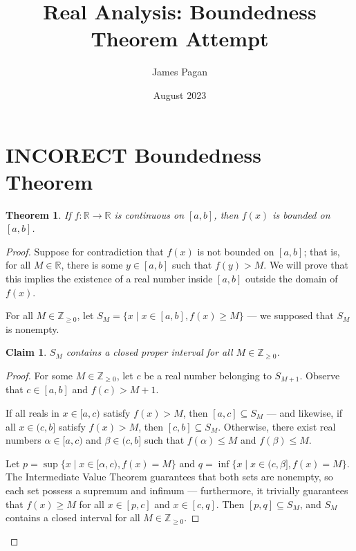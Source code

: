 \documentclass[11pt]{article}
\title{Real Analysis: Boundedness Theorem Attempt}
\author{James Pagan}
\date{August 2023}
\newtheorem*{theorem*}{Theorem}
\newtheorem*{claim*}{Claim}
\begin{document}
\maketitle
\tableofcontents


\section{INCORECT Boundedness Theorem}

\begin{theorem*}
	If $f \colon \mathbb{R} \to \mathbb{R}$ is continuous on $[a, b]$, then $f(x)$ is bounded on $[a, b]$.
\end{theorem*}

\begin{proof}

Suppose for contradiction that $f(x)$ is not bounded on $[a, b]$; that is, for all $M \in \mathbb{R}$, there is some $y \in [a, b]$ such that $f(y) > M$. We will prove that this implies the existence of a real number inside $[a, b]$ outside the domain of $f(x)$.

For all $M \in \mathbb{Z}_{\ge 0}$, let $S_M = \{ x \mid x \in [a, b], f(x) \ge M \}$ --- we supposed that $S_M$ is nonempty.


\begin{adjustwidth}{1cm}{}
	\begin{claim*}
		$S_M$ contains a closed proper interval for all $M \in \mathbb{Z}_{\ge 0}$.
	\end{claim*}
    \begin{proof}\renewcommand{\qedsymbol}{}
		For some $M \in \mathbb{Z}_{\ge 0}$, let $c$ be a real number belonging to $S_{M+1}$. Observe that $c \in [a, b]$ and $f(c) > M+1$.

		If all reals in $x \in [a, c)$ satisfy $f(x) > M$, then $[a, c] \subseteq S_{M}$ --- and likewise, if all $x \in (c, b]$ satisfy $f(x) > M$, then $[c, b] \subseteq S_{M}$. Otherwise, there exist real numbers $\alpha \in [a, c)$ and $\beta \in (c, b]$ such that $f(\alpha) \le M$ and $f(\beta) \le M$.

		Let $p = \sup \{ x \mid x \in [\alpha, c), f(x) = M \}$ and $q = \inf \{ x \mid x \in (c, \beta], f(x) = M \}$. The Intermediate Value Theorem guarantees that both sets are nonempty, so each set possess a supremum and infimum --- furthermore, it trivially guarantees that $f(x) \ge M$ for all $x \in [p, c]$ and $x \in [c, q]$. Then $[p, q] \subseteq S_M$, and $S_M$ contains a closed interval for all $M \in \mathbb{Z}_{\ge 0}$.
	\end{proof}
\end{adjustwidth}


\end{proof}
\end{document}
